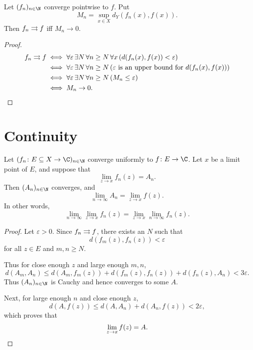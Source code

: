 \begin{theorem} \label{thm:ssfn:sup}
    Let $(f_n)_{n \in \N}$ converge pointwise to $f$.
    Put \[
        M_n = \sup_{x \in X} d_Y(f_n(x), f(x)).
    \] Then $f_n \rightrightarrows f$ iff $M_n \to 0$.
\end{theorem}
\begin{proof}
    \begin{align*}
        f_n \rightrightarrows f
        &\iff \forall\varepsilon \,\exists N \,\forall n \ge N \,\forall x\,
            (d(f_n(x), f(x)) < \varepsilon) \\
        &\iff \forall\varepsilon \,\exists N \,\forall n \ge N\,
            (\varepsilon \text{ is an upper bound for } d(f_n(x), f(x))) \\
        &\iff \forall\varepsilon \,\exists N \,\forall n \ge N\,
            (M_n \le \varepsilon) \\
        &\iff M_n \to 0. \qedhere
    \end{align*}
\end{proof}

\section{Continuity} \label{sec:ssfn:cont}
\begin{theorem} \label{thm:ssfn:limswap}
    Let $(f_n\colon E \subseteq X \to \C)_{n \in \N}$ converge uniformly
    to $f\colon E \to \C$.
    Let $x$ be a limit point of $E$, and suppose that \[
        \lim_{z \to x} f_n(z) = A_n.
    \] Then $(A_n)_{n \in \N}$ converges, and \[
        \lim_{n \to \infty} A_n = \lim_{z \to x} f(z).
    \] In other words, \[
        \lim_{n \to \infty} \lim_{z \to x} f_n(z)
            = \lim_{z \to x} \lim_{n \to \infty} f_n(z).
    \]
\end{theorem}
\begin{proof}
    Let $\varepsilon > 0$.
    Since $f_n \rightrightarrows f$, there exists an $N$ such that \[
        d(f_m(z), f_n(z)) < \varepsilon
    \] for all $z \in E$ and $m, n \ge N$.

    Thus for close enough $z$ and large enough $m, n$, \[
        d(A_m, A_n) \le d(A_m, f_m(z)) + d(f_m(z), f_n(z)) + d(f_n(z), A_n)
            < 3\varepsilon.
    \] Thus $(A_n)_{n \in \N}$ is Cauchy and hence converges to some $A$.

    Next, for large enough $n$ and close enough $z$, \[
        d(A, f(z)) \le d(A, A_n) + d(A_n, f(z)) < 2\varepsilon,
    \] which proves that \[
        \lim_{z \to x} f(z) = A. \qedhere
    \]
\end{proof}

